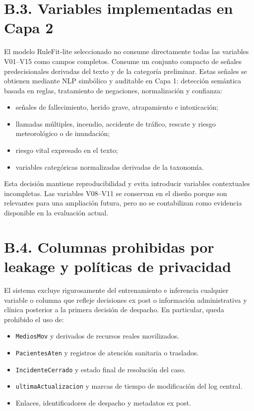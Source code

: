 \section*{B.3. Variables implementadas en Capa 2}

El modelo RuleFit-lite seleccionado no consume directamente todas las variables V01--V15
como campos completos. Consume un conjunto compacto de señales predecisionales derivadas
del texto y de la categoría preliminar. Estas señales se obtienen mediante NLP
simbólico y auditable en Capa 1: detección semántica basada en reglas, tratamiento de
negaciones, normalización y confianza:

\begin{itemize}
    \item señales de fallecimiento, herido grave, atrapamiento e intoxicación;
    \item llamadas múltiples, incendio, accidente de tráfico, rescate y riesgo
    meteorológico o de inundación;
    \item riesgo vital expresado en el texto;
    \item variables categóricas normalizadas derivadas de la taxonomía.
\end{itemize}

Esta decisión mantiene reproducibilidad y evita introducir variables contextuales
incompletas. Las variables V08--V11 se conservan en el diseño porque son relevantes
para una ampliación futura, pero no se contabilizan como evidencia disponible en la
evaluación actual.

\section*{B.4. Columnas prohibidas por leakage y políticas de privacidad}

El sistema excluye rigurosamente del entrenamiento e inferencia cualquier variable o columna que refleje decisiones ex post o información administrativa y clínica posterior a la primera decisión de despacho. En particular, queda prohibido el uso de:

\begin{itemize}
    \item \texttt{MediosMov} y derivados de recursos reales movilizados.
    \item \texttt{PacientesAten} y registros de atención sanitaria o traslados.
    \item \texttt{IncidenteCerrado} y estado final de resolución del caso.
    \item \texttt{ultimaActualizacion} y marcas de tiempo de modificación del log central.
    \item Enlaces, identificadores de despacho y metadatos ex post.
\end{itemize}

